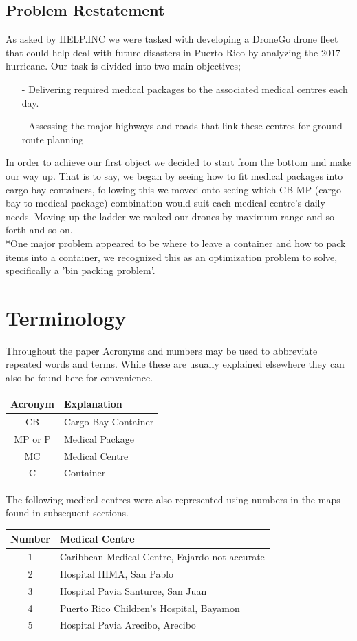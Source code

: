 \documentclass[a4paper,12pt]{article}
\begin{document}
\subsection{Problem Restatement}
As asked by HELP.INC we were tasked with developing a DroneGo drone fleet that could help deal with future disasters in
Puerto Rico by analyzing the 2017 hurricane. Our task is divided into two main objectives;
\begin{itemize}
\item[-]Delivering required medical packages to the associated medical centres each day.
\item[-]Assessing the major highways and roads that link these centres for ground route planning
\end{itemize}
In order to achieve our first object we decided to start from the bottom and make our way up. That is to say, we began by seeing how to fit medical packages into cargo bay containers, following this
we moved onto seeing which CB-MP (cargo bay to medical package) combination would suit each medical centre's daily needs. Moving up the ladder we ranked our drones by maximum range and so forth and so on.
\\*One major problem appeared to be where to leave a container and how to pack items into a container, we recognized this as an optimization problem to solve, specifically a 'bin packing problem'.

\section{Terminology}
Throughout the paper Acronyms and numbers may be used to abbreviate repeated words and terms. While these are usually explained elsewhere they can also be found here for convenience.

\begin{center}
\begin{tabular}{ |c|l| }
\hline
 Acronym & Explanation  \\\hline
 CB & Cargo Bay Container  \\
 MP or P & Medical Package \\
 MC & Medical Centre\\
 C & Container \\
 \hline
\end{tabular}
\end{center}
The following medical centres were also represented using numbers in the maps found in subsequent sections.

\begin{center}
\begin{tabular}{ |c|l| }
 \hline
 Number & Medical Centre  \\\hline
 1 & Caribbean Medical Centre, Fajardo not accurate  \\
 2 & Hospital HIMA, San Pablo \\
 3 & Hospital Pavia Santurce, San Juan \\
 4 & Puerto Rico Children's Hospital, Bayamon \\
 5 & Hospital Pavia Arecibo, Arecibo  \\
 \hline
\end{tabular}
\end{center}
\end{document}
